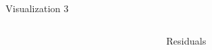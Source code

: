 \begin{frame}{Visualization 3}
\begin{columns}
\begin{column}{0.49\textwidth}
\begin{center}
    \end{center}  
  \end{column}
  \begin{column}{0.49\textwidth}
    \begin{center}
    Residuals 

\end{center}
\end{column}
\end{columns}
\end{frame}

